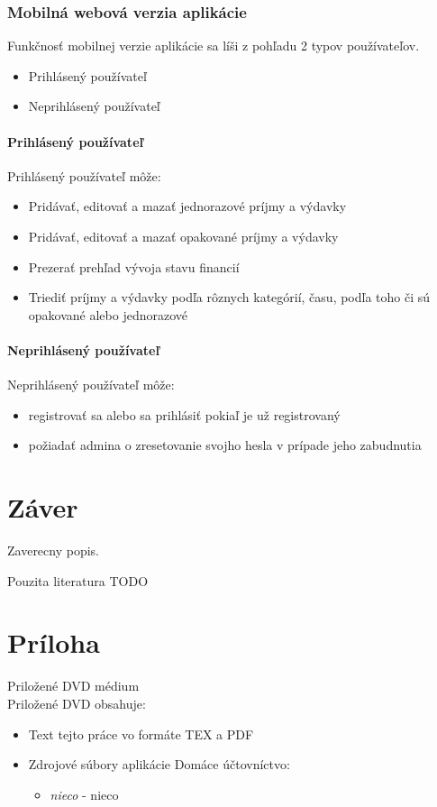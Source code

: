 \documentclass[12pt]{book}
\begin{document}
\subsection{Mobilná webová verzia aplikácie}
Funkčnosť mobilnej verzie aplikácie sa líši z pohľadu 2 typov používateľov.
\begin{itemize}
\item{Prihlásený používateľ}
\item{Neprihlásený používateľ}
\end{itemize}

\subsubsection{Prihlásený používateľ}
Prihlásený používateľ môže:
\begin{itemize}
\item{Pridávať, editovať a mazať jednorazové príjmy a výdavky}
\item{Pridávať, editovať a mazať opakované príjmy a výdavky}
\item{Prezerať prehľad vývoja stavu financií}
\item{Triediť príjmy a výdavky podľa rôznych kategórií, času, podľa toho či sú opakované alebo jednorazové}
\end{itemize}

\subsubsection{Neprihlásený používateľ}
Neprihlásený používateľ môže:
\begin{itemize}
\item{registrovať sa alebo sa prihlásiť pokiaľ je už registrovaný}
\item{požiadať admina o zresetovanie svojho hesla v prípade jeho zabudnutia}
\end{itemize}



\chapter{Záver}\label{chap:outro}

Zaverecny popis.

\backmatter

\nocite{*}



Pouzita literatura TODO

\newcommand{\dbappendix}[1]{\chapter{#1}}
\appendix
\dbappendix{Príloha}\label{appA}
{\large Priložené DVD médium}\\

Priložené DVD obsahuje:\\
\begin{itemize}
\item Text tejto práce vo formáte TEX a PDF
\item Zdrojové súbory aplikácie Domáce účtovníctvo:
	\begin{itemize}
		\item {\em nieco} - nieco
	\end{itemize}
\end{itemize}
\end{document}
